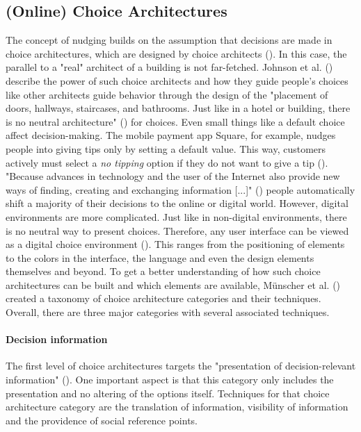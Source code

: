 \subsection{(Online) Choice Architectures}
The concept of nudging builds on the assumption that decisions are made in choice architectures, which are designed by choice architects (\cite{thaler_nudge:_2009}). In this case, the parallel to a "real" architect of a building is not far-fetched. Johnson et al. (\cite{johnson_beyond_2012}) describe the power of such choice architects and how they guide people's choices like other architects guide behavior through the design of the "placement of doors, hallways, staircases, and bathrooms. Just like in a hotel or building, there is no neutral architecture" (\cite[p.488]{johnson_beyond_2012}) for choices. Even small things like a default choice affect decision-making. The mobile payment app Square, for example, nudges people into giving tips only by setting a default value. This way, customers actively must select a \textit{no tipping} option if they do not want to give a tip (\cite{weinmann_digital_2016}). "Because advances in technology and the user of the Internet also provide new ways of finding, creating and exchanging information [...]" (\cite[p.609]{broniarczyk_decision_2014}) people automatically shift a majority of their decisions to the online or digital world. However, digital environments are more complicated. Just like in non-digital environments, there is no neutral way to present choices. Therefore, any user interface can be viewed as a digital choice environment (\cite{schneider_digital_2018}). This ranges from the positioning of elements to the colors in the interface, the language and even the design elements themselves and beyond.
To get a better understanding of how such choice architectures can be built and which elements are available, Münscher et al. (\citeyear{munscher_review_2016}) created a taxonomy of choice architecture categories and their techniques. Overall, there are three major categories with several associated techniques. 
\paragraph{Decision information}
The first level of choice architectures targets the "presentation of decision-relevant information" (\cite[p.514]{munscher_review_2016}). One important aspect is that this category only includes the presentation and no altering of the options itself. Techniques for that choice architecture category are the translation of information, visibility of information and the providence of social reference points.
